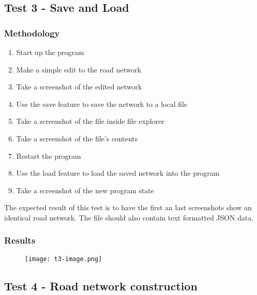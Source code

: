     \subsection{Test 3 - Save and Load}

        \subsubsection{Methodology}

            \begin{enumerate}
                \item Start up the program
                \item Make a simple edit to the road network
                \item Take a screenshot of the edited network
                \item Use the save feature to save the network to a local file
                \item Take a screenshot of the file inside file explorer
                \item Take a screenshot of the file's contents
                \item Restart the program
                \item Use the load feature to load the saved network into the program
                \item Take a screenshot of the new program state
            \end{enumerate}

            The expected result of this test is to have the first an last screenshots show an identical road network. The file should also contain text formatted JSON data.

            \subsubsection{Results}

                \begin{figure}[ht]
                    \centering
                    \texttt{[image: t3-image.png]}
                    \caption{}
                    \label{testing:t3-image}
                \end{figure}

    \subsection{Test 4 - Road network construction}

